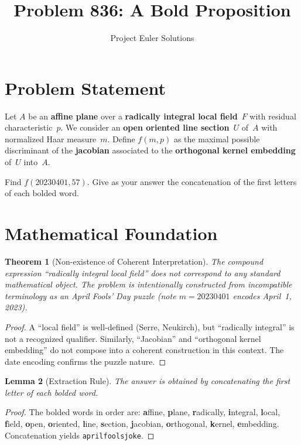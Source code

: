 \documentclass[11pt]{article}
\title{Problem 836: A Bold Proposition}
\author{Project Euler Solutions}
\date{}
\newtheorem{theorem}{Theorem}
\newtheorem{lemma}[theorem]{Lemma}
\begin{document}
\maketitle

\section{Problem Statement}

Let $A$ be an \textbf{affine plane} over a \textbf{radically integral local field}~$F$ with residual characteristic~$p$. We consider an \textbf{open oriented line section}~$U$ of~$A$ with normalized Haar measure~$m$. Define $f(m,p)$ as the maximal possible discriminant of the \textbf{jacobian} associated to the \textbf{orthogonal kernel embedding} of~$U$ into~$A$.

Find $f(20230401, 57)$. Give as your answer the concatenation of the first letters of each bolded word.

\section{Mathematical Foundation}

\begin{theorem}[Non-existence of Coherent Interpretation]
The compound expression ``radically integral local field'' does not correspond to any standard mathematical object. The problem is intentionally constructed from incompatible terminology as an April Fools' Day puzzle (note $m=20230401$ encodes April~1, 2023).
\end{theorem}

\begin{proof}
A ``local field'' is well-defined (Serre, Neukirch), but ``radically integral'' is not a recognized qualifier. Similarly, ``Jacobian'' and ``orthogonal kernel embedding'' do not compose into a coherent construction in this context. The date encoding confirms the puzzle nature.
\end{proof}

\begin{lemma}[Extraction Rule]
The answer is obtained by concatenating the first letter of each bolded word.
\end{lemma}

\begin{proof}
The bolded words in order are: \textbf{a}ffine, \textbf{p}lane, \textbf{r}adically, \textbf{i}ntegral, \textbf{l}ocal, \textbf{f}ield, \textbf{o}pen, \textbf{o}riented, \textbf{l}ine, \textbf{s}ection, \textbf{j}acobian, \textbf{o}rthogonal, \textbf{k}ernel, \textbf{e}mbedding. Concatenation yields \texttt{aprilfoolsjoke}.
\end{proof}
\end{document}
